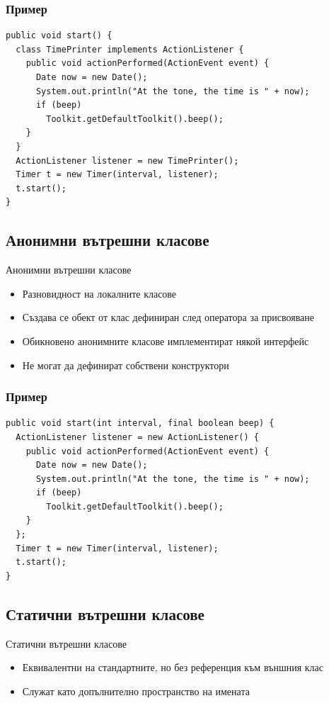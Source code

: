 \documentclass{beamer}
\begin{document}
\begin{frame}[fragile]
  \frametitle{Пример}
  \transdissolve
\begin{lstlisting}[basicstyle=\small]
public void start() {
  class TimePrinter implements ActionListener {
    public void actionPerformed(ActionEvent event) {
      Date now = new Date();
      System.out.println("At the tone, the time is " + now);
      if (beep) 
        Toolkit.getDefaultToolkit().beep();
    }
  }
  ActionListener listener = new TimePrinter();
  Timer t = new Timer(interval, listener);
  t.start();
}  
\end{lstlisting}
\end{frame}

\subsection{Анонимни вътрешни класове}
\begin{frame}{Анонимни вътрешни класове}
  \transdissolve
  \begin{itemize}
  \item Разновидност на локалните класове \pause
  \item Създава се обект от клас дефиниран след оператора за
    присвояване \pause
  \item Обикновено анонимните класове имплементират някой интерфейс
    \pause
  \item Не могат да дефинират собствени конструктори
  \end{itemize}
\end{frame}

\begin{frame}[fragile]
  \frametitle{Пример}
  \transdissolve
\begin{lstlisting}[basicstyle=\small]
public void start(int interval, final boolean beep) {
  ActionListener listener = new ActionListener() {
    public void actionPerformed(ActionEvent event) {
      Date now = new Date();
      System.out.println("At the tone, the time is " + now);
      if (beep) 
        Toolkit.getDefaultToolkit().beep();
    }
  };
  Timer t = new Timer(interval, listener);
  t.start();
} 
\end{lstlisting}
\end{frame}

\subsection{Статични вътрешни класове}
\begin{frame}{Статични вътрешни класове}
  \transdissolve
  \begin{itemize}
  \item Еквивалентни на стандартните, но без референция към външния
    клас  \pause
  \item Служат като допълнително пространство на имената
  \end{itemize}
\end{frame}
\end{document}
